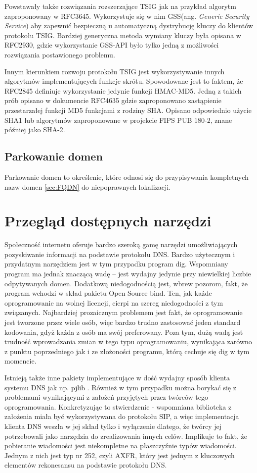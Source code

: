Powstawały także rozwiązania rozszerzające TSIG jak na przykład algorytm zaproponowany w RFC3645\cite{RFC3645}. Wykorzystuje się
w nim GSS\cite{RFC2743}(ang. \textit{Generic Security Service}) aby zapewnić bezpieczną u automatyczną dystrybucję kluczy do
klientów protokołu TSIG. Bardziej generyczna metoda wymiany kluczy była opisana w RFC2930\cite{RFC2930}, gdzie wykorzystanie
GSS-API było tylko jedną z możliwości rozwiązania postawionego problemu.

Innym kierunkiem rozwoju protokołu TSIG jest wykorzystywanie innych algorytmów implementujących funkcje skrótu. Spowodowane
jest to faktem, że RFC2845\cite{RFC2845} definiuje wykorzystanie jedynie funkcji HMAC-MD5. Jedną z takich prób opisano w
dokumencie RFC4635\cite{RFC4635} gdzie zaproponowano zastąpienie przestarzałej funkcji MD5 funkcjami z rodziny SHA. Opisano
odpowiednio użycie SHA1\cite{RFC3174} lub algorytmów zaproponowane w projekcie FIPS PUB 180-2, znane później jako SHA-2\cite{RFC4634}.

\section{Parkowanie domen}
Parkowanie domen to określenie, które odnosi się do przypisywania kompletnych nazw domen \ref{sec:FQDN} do niepoprawnych lokalizacji.


\chapter{Przegląd dostępnych narzędzi}
Społeczność internetu oferuje bardzo szeroką gamę narzędzi umożliwiających pozyskiwanie informacji na podstawie protokołu DNS.
Bardzo użytecznym i przydatnym narzędziem jest w tym przypadku program dig. Wspomniany program ma jednak znaczącą wadę -- jest
wydajny jedynie przy niewielkiej liczbie odpytywanych domen. Dodatkową niedogodnością jest, wbrew pozorom, fakt, że program
wchodzi w skład pakietu Open Source bind. Ten, jak każde oprogramowanie na wolnej licencji, cierpi na szereg niedogodności z
tym związanych. Najbardziej prozaicznym problemem jest fakt, że oprogramowanie jest tworzone przez wiele osób, więc bardzo
trudno zastosować jeden standard kodowania, gdyż każda z osób ma swój preferowany. Poza tym, dużą wadą jest trudność wprowadzania
zmian w tego typu oprogramowaniu, wynikająca zarówno z punktu poprzedniego jak i ze złożoności programu, którą cechuje się dig
w tym momencie.

Istnieją także inne pakiety implementujące w dość wydajny sposób klienta systemu DNS jak np. pjlib \cite{pjlib}. Również w tym
przypadku można borykać się z problemami wynikającymi z założeń przyjętych przez twórców tego oprogramowania. Konkretyzując to
stwierdzenie - wspomniana biblioteka z założenia miała być wykorzystywana do protokołu SIP, a więc implementacja klienta DNS
weszła w jej skład tylko i wyłączenie dlatego, że twórcy jej potrzebowali jako narzędzia do zrealizowania innych celów.
Implikuje to fakt, że pobieranie wiadomości jest niekompletne na płaszczyźnie typów wiadomości. Jednym z nich jest typ nr 252,
czyli AXFR, który jest jednym z kluczowych elementów rekonesansu na podstawie protokołu DNS.
